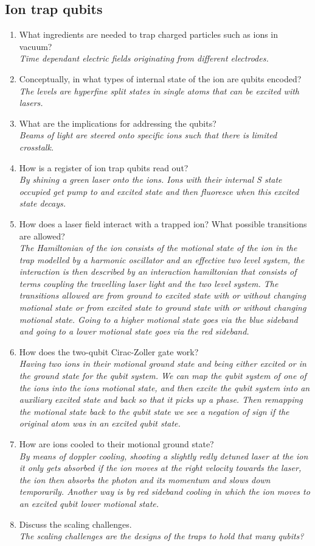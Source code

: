 \documentclass[a4paper]{scrartcl}
\newcommand{\qa}[2]{#1\\ \textit{#2}}
\begin{document}
\subsection*{Ion trap qubits}
\begin{enumerate}
\item \qa{What ingredients are needed to trap charged particles such as ions in vacuum?}{Time dependant electric fields originating from different electrodes.}
\item \qa{Conceptually, in what types of internal state of the ion are qubits encoded?}{The levels are hyperfine split states in single atoms that can be excited with lasers.}
\item \qa{What are the implications for addressing the qubits?}{Beams of light are steered onto specific ions such that there is limited crosstalk.}
\item \qa{How is a register of ion trap qubits read out?}{By shining a green laser onto the ions. Ions with their internal S state occupied get pump to and excited state and then fluoresce when this excited state decays.}
\item \qa{How does a laser field interact with a trapped ion? What possible transitions are allowed?}{The Hamiltonian of the ion consists of the motional state of the ion in the trap modelled by a harmonic oscillator and an effective two level system, the interaction is then described by an interaction hamiltonian that consists of terms coupling the travelling laser light and the two level system. The transitions allowed are from ground to excited state with or without changing motional state or from excited state to ground state with or without changing motional state. Going to a higher motional state goes via the blue sideband and going to a lower motional state goes via the red sideband.}
\item \qa{How does the two-qubit Cirac-Zoller gate work?}{Having two ions in their motional ground state and being either excited or in the ground state for the qubit system. We can map the qubit system of one of the ions into the ions motional state, and then excite the qubit system into an auxiliary excited state and back so that it picks up a phase. Then remapping the motional state back to the qubit state we see a negation of sign if the original atom was in an excited qubit state.}
\item \qa{How are ions cooled to their motional ground state?}{By means of doppler cooling, shooting a slightly redly detuned laser at the ion it only gets absorbed if the ion moves at the right velocity towards the laser, the ion then absorbs the photon and its momentum and slows down temporarily. Another way is by red sideband cooling in which the ion moves to an excited qubit lower motional state.}
\item \qa{Discuss the scaling challenges.}{The scaling challenges are the designs of the traps to hold that many qubits?}
\end{enumerate}
\end{document}
